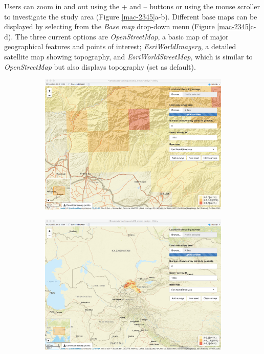 \documentclass[a4paper,11pt]{article} %
\begin{document}
Users can zoom in and out using the + and -- buttons or using the mouse scroller to investigate the study area (Figure \ref{mac-2345}a-b). Different base maps can be displayed by selecting from the \textit{Base map} drop-down menu (Figure \ref{mac-2345}c-d). The three current options are \textit{OpenStreetMap}, a basic map of major geographical features and points of interest; \textit{EsriWorldImagery}, a detailed satellite map showing topography, and \textit{EsriWorldStreetMap}, which is similar to \textit{OpenStreetMap} but also displays topography (set as default).  

\begin{figure}[htbp]
\centering
  \begin{subfigure}[b]{0.49\textwidth}
    \includegraphics[width=\textwidth]{mac-2}
    \caption{}
  \end{subfigure}
  \begin{subfigure}[b]{0.49\textwidth}
    \includegraphics[width=\textwidth]{mac-3}

\end{subfigure}
\end{figure}
\end{document}

